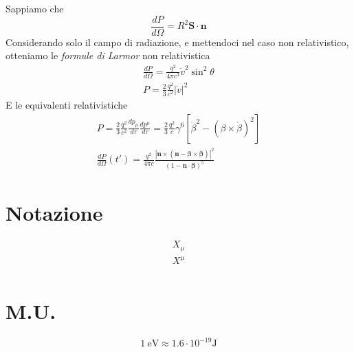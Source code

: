 \documentclass[a4paper, twocolumn]{article}
\begin{document}
Sappiamo che
\begin{equation}
  \label{eq:27}
  \frac{dP}{d\Omega}=R^2 \mathbf{S}\cdot\mathbf{n}
\end{equation}
Considerando solo il campo di radiazione, e mettendoci nel caso non relativistico, otteniamo le \emph{formule di Larmor} non relativistica
\begin{align}
  \label{eq:26}
  \frac{dP}{d\Omega}=\frac{q^2}{4\pi c^3}\dot{v}^2\sin^2\theta \\
  P=\frac{2}{3}\frac{q^2}{c^2}\left| \dot{v}\right|^2
\end{align}
E le equivalenti relativistiche
\begin{align}
  \label{eq:28}
  P=\frac{2}{3}\frac{q^2}{c^2} \frac{dp_\mu}{d\tau} \frac{dp^\mu}{d\tau}=\frac{2}{3}\frac{q^2}{c}\gamma^6[\dot{\beta}^2-(\beta\times\dot{\beta})^2] \\
  \frac{dP}{d\Omega}(t')=\frac{q^2}{4\pi c}\frac{\left|\mathbf{n}\times(\mathbf{n}-\mathbf{\beta}\times\dot{\mathbf{\beta}})   \right|^2}{(1-\mathbf{n}\cdot\mathbf{\beta})^5}
\end{align}





\section{Notazione}
\label{sec:notazione}
\begin{align}
  \label{eq:11}
  X_{\mu} \tag*{covariante} \\
  X^{\mu} \tag*{controvariante} \\
\end{align}

\section{M.U.}
\begin{equation}
	1 ~\mathrm{eV} \approx 1.6 \cdot 10^{-19} \mathrm{J}
\end{equation}
\end{document}
